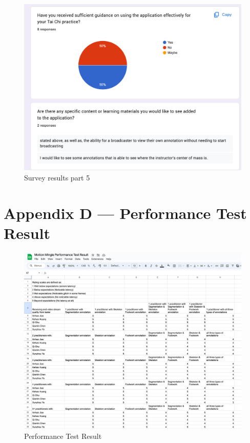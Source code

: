 \documentclass[12pt, titlepage]{article}
\begin{document}
\begin{figure}[!]
  \centering
  \includegraphics[width=1.0\linewidth]{surveyp5.png}
  \caption{Survey results part 5}
  \label{fig:surveyp5}
\end{figure}
\FloatBarrier

\section*{Appendix D --- Performance Test Result}
\FloatBarrier
\begin{figure}[!]
  \centering
  \includegraphics[width=1.0\linewidth]{performance.png}
  \caption{Performance Test Result}
  \label{fig:performance}
\end{figure}
\FloatBarrier
\end{document}
